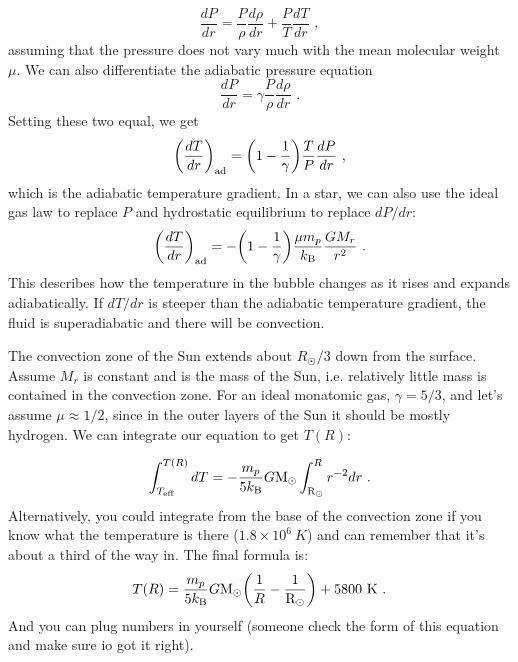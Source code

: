 \begin{enumerate}
	\begin{equation}
	\frac{dP}{dr} = \frac{P}{\rho} \frac{d \rho}{dr} + \frac{P}{T} \frac{d T}{dr} \,\, ,
	\end{equation}
	assuming that the pressure does not vary much with the mean molecular weight $\mu$. We can also differentiate the adiabatic pressure equation
	\begin{equation}
	\frac{dP}{dr} = \gamma \frac{P}{\rho}\frac{d\rho}{dr}\,\, .
	\end{equation}
	Setting these two equal, we get
	\begin{equation}
	\biggl(\frac{dT}{dr}\biggr)_{\rm ad} = \biggl(1 - \frac{1}{\gamma}\biggr)\frac{T}{P} \frac{dP}{dr}\,\, ,
	\end{equation}
	which is the adiabatic temperature gradient. In a star, we can also use the ideal gas law to replace $P$ and hydrostatic equilibrium to replace $dP/dr$:
	\begin{equation}\label{conv}
	\biggl(\frac{dT}{dr}\biggr)_{\rm ad} = -\biggl(1 - \frac{1}{\gamma}\biggr)\frac{\mu m_p}{k_{\rm B}} \frac{G M_r}{r^2}\,\, .
	\end{equation}
	This describes how the temperature in the bubble changes as it rises and expands adiabatically. If $dT/dr$ is steeper than the adiabatic temperature gradient, the fluid is superadiabatic and there will be convection.
	
	The convection zone of the Sun extends about $R_\astrosun/3$ down from the surface. Assume $M_r$ is constant and is the mass of the Sun, i.e. relatively little mass is contained in the convection zone. For an ideal monatomic gas, $\gamma = 5/3$, and let's assume $\mu \approx 1/2$, since in the outer layers of the Sun it should be mostly hydrogen. We can integrate our equation to get $T(R)$:
	
	\begin{equation}
	\int^{T(R)}_{T_{\rm eff}} dT = -\frac{m_p}{5 k_{\rm B}} G {\rm M}_\odot \int^R_{\rm R_\odot} r^{-2}dr \,\, .
	\end{equation}
	Alternatively, you could integrate from the base of the convection zone if you know what the temperature is there ($1.8 \times 10^6~K$) and can remember that it's about a third of the way in. The final formula is:
	\begin{equation}
	T(R) = \frac{m_p}{5 k_{\rm B}} G {\rm M}_\odot \biggl( \frac{1}{R} - \frac{1}{{\rm R}_\odot}\biggr) + 5800~{\rm K}\,\, .
	\end{equation}
	And you can plug numbers in yourself (someone check the form of this equation and make sure io got it right).
	

\end{enumerate}
